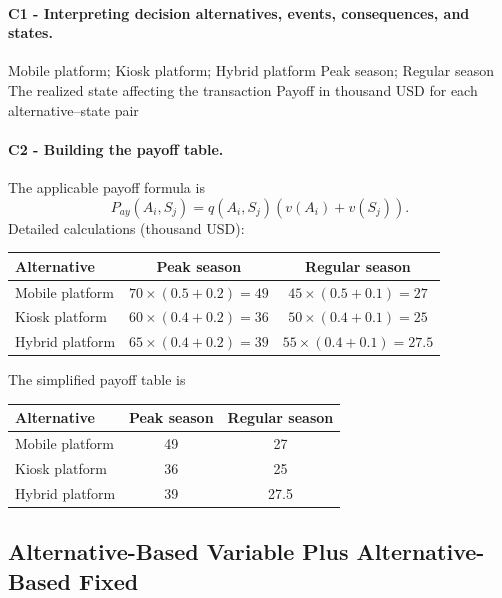 	\paragraph*{C1 - Interpreting decision alternatives, events, consequences, and states.}
	\label{subsec:problem15-museum-ticket-platform-c1}
	\DecisionElementsTable
	{Mobile platform; Kiosk platform; Hybrid platform}
	{Peak season; Regular season}
	{The realized state affecting the transaction}
	{Payoff in thousand USD for each alternative--state pair}

	\paragraph*{C2 - Building the payoff table.}
	\label{subsec:problem15-museum-ticket-platform-c2}
	The applicable payoff formula is
	\[ P_{ay}(A_i,S_j)=q(A_i,S_j)\left(v(A_i)+v(S_j)\right). \]
	Detailed calculations (thousand USD):
	\begin{center}\small
	\begin{tabular}{lcc}
	\toprule
	Alternative & Peak season & Regular season \\
	\midrule
	Mobile platform & $70\times(0.5+0.2)=49$ & $45\times(0.5+0.1)=27$ \\
Kiosk platform & $60\times(0.4+0.2)=36$ & $50\times(0.4+0.1)=25$ \\
Hybrid platform & $65\times(0.4+0.2)=39$ & $55\times(0.4+0.1)=27.5$ \\
	\bottomrule
	\end{tabular}
	\end{center}
	The simplified payoff table is
	\begin{center}
	\begin{tabular}{lcc}
	\toprule
	Alternative & Peak season & Regular season \\
	\midrule
	Mobile platform & 49 & 27 \\
Kiosk platform & 36 & 25 \\
Hybrid platform & 39 & 27.5 \\
	\bottomrule
	\end{tabular}
	\end{center}

	\subsection{Alternative-Based Variable Plus Alternative-Based Fixed}
	\label{sec:alternative-based-variable-payoff-plus-alternative-based-fixed-payoff}

